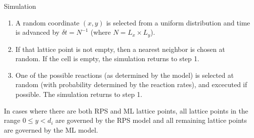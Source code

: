 \documentclass{beamer}
\begin{document}
\begin{frame}{}
\begin{textblock}{0.32}
\begin{block}{\centering Simulation}
        \begin{enumerate}
            \item A random coordinate $(x, y)$ is selected from a uniform distribution
                and time is advanced by $\delta t = N^{-1} $ (where $N = L_x \times L_y$).
            \item If that lattice point is not empty, then a nearest neighbor is chosen
                at random. If the cell is empty, the simulation returns to step 1.
            \item One of the possible reactions (as determined by the model) is 
                selected at random (with probability determined by the reaction 
                rates), and excecuted if possible. The simulation returns to step 1.
        \end{enumerate}

        In cases where there are both RPS and ML lattice points, all lattice points
        in the range $0 \leq y < d_i$ are governed by the RPS model and all 
        remaining lattice points are governed by the ML model.
    \end{block}
\end{textblock}


\end{frame}
\end{document}
